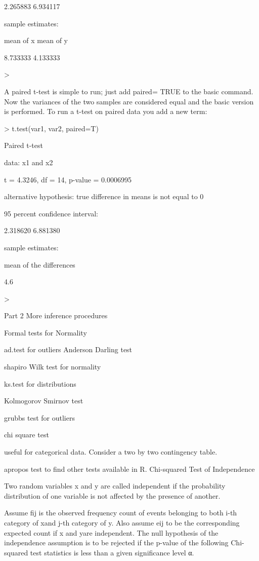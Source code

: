 2.265883 6.934117

sample estimates:

mean of x mean of y

8.733333 4.133333

>

 



A paired t-test is simple to run; just add paired= TRUE to the basic command. Now the variances of the two samples are considered equal and the basic version is performed. To run a t-test on paired data you add a new term:

> t.test(var1, var2, paired=T)

Paired t-test

data: x1 and x2

t = 4.3246, df = 14, p-value = 0.0006995

alternative hypothesis: true difference in means is not equal to 0

95 percent confidence interval:

2.318620 6.881380

sample estimates:

mean of the differences

4.6

>

 






Part 2 More inference procedures

Formal tests for Normality



ad.test for outliers Anderson Darling test


shapiro Wilk test for normality


ks.test for distributions

Kolmogorov Smirnov test

grubbs test for outliers

chi square test


useful for categorical data. Consider a two by two contingency table.


apropos test to find other tests available in R. Chi-squared Test of Independence

Two random variables x and y are called independent if the probability distribution of one variable is not affected by the presence of another.

Assume fij is the observed frequency count of events belonging to both i-th category of xand j-th category of y. Also assume eij to be the corresponding expected count if x and yare independent. The null hypothesis of the independence assumption is to be rejected if the p-value of the following Chi-squared test statistics is less than a given significance level α.




